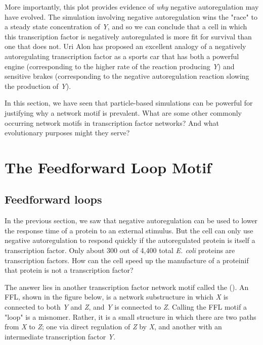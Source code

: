 More importantly, this plot provides evidence of \textit{why} negative autoregulation may have evolved. The simulation involving negative autoregulation wins the "race" to a steady state concentration of \textit{Y}, and so we can conclude that a cell in which this transcription factor is negatively autoregulated is more fit for survival than one that does not. Uri Alon has proposed an excellent analogy of a negatively autoregulating transcription factor as a sports car that has both a powerful engine (corresponding to the higher rate of the reaction producing \textit{Y}) and sensitive brakes (corresponding to the negative autoregulation reaction slowing the production of \textit{Y}).

In this section, we have seen that particle-based simulations can be powerful for justifying why a network motif is prevalent. What are some other commonly occurring network motifs in transcription factor networks? And what evolutionary purposes might they serve?


\FloatBarrier
{}

\section{The Feedforward Loop Motif}
\label{sec:the_feedforward_loop_motif}

\subsection{Feedforward loops}

In the previous section, we saw that negative autoregulation can be used to lower the response time of a protein to an external stimulus. But the cell can only use negative autoregulation to respond quickly if the autoregulated protein is itself a transcription factor. Only about 300 out of 4,400 total \textit{E. coli} proteins are transcription factors. How can the cell speed up the manufacture of a proteinif that protein is not a transcription factor?

The answer lies in another transcription factor network motif called the  (). An FFL, shown in the figure below, is a network substructure in which \textit{X} is connected to both \textit{Y} and \textit{Z}, and \textit{Y} is connected to \textit{Z}. Calling the FFL motif a "loop" is a misnomer. Rather, it is a small structure in which there are two paths from \textit{X} to \textit{Z}; one via direct regulation of \textit{Z} by \textit{X}, and another with an intermediate transcription factor \textit{Y}.

